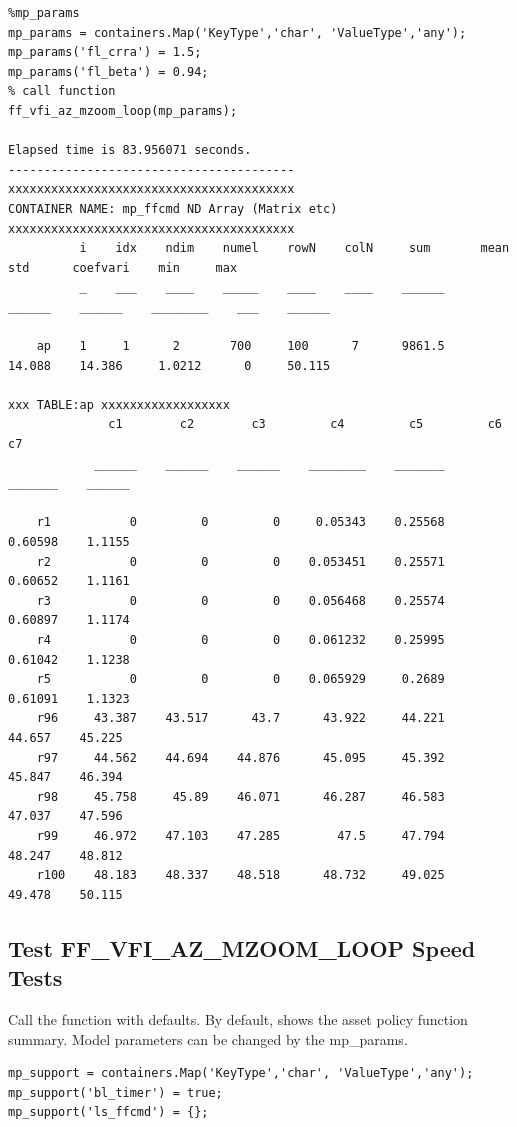 \documentclass[
]{book}
\begin{document}
\begin{verbatim}
%mp_params
mp_params = containers.Map('KeyType','char', 'ValueType','any');
mp_params('fl_crra') = 1.5;
mp_params('fl_beta') = 0.94;
% call function
ff_vfi_az_mzoom_loop(mp_params);

Elapsed time is 83.956071 seconds.
----------------------------------------
xxxxxxxxxxxxxxxxxxxxxxxxxxxxxxxxxxxxxxxx
CONTAINER NAME: mp_ffcmd ND Array (Matrix etc)
xxxxxxxxxxxxxxxxxxxxxxxxxxxxxxxxxxxxxxxx
          i    idx    ndim    numel    rowN    colN     sum       mean      std      coefvari    min     max  
          _    ___    ____    _____    ____    ____    ______    ______    ______    ________    ___    ______

    ap    1     1      2       700     100      7      9861.5    14.088    14.386     1.0212      0     50.115

xxx TABLE:ap xxxxxxxxxxxxxxxxxx
              c1        c2        c3         c4         c5         c6         c7  
            ______    ______    ______    ________    _______    _______    ______

    r1           0         0         0     0.05343    0.25568    0.60598    1.1155
    r2           0         0         0    0.053451    0.25571    0.60652    1.1161
    r3           0         0         0    0.056468    0.25574    0.60897    1.1174
    r4           0         0         0    0.061232    0.25995    0.61042    1.1238
    r5           0         0         0    0.065929     0.2689    0.61091    1.1323
    r96     43.387    43.517      43.7      43.922     44.221     44.657    45.225
    r97     44.562    44.694    44.876      45.095     45.392     45.847    46.394
    r98     45.758     45.89    46.071      46.287     46.583     47.037    47.596
    r99     46.972    47.103    47.285        47.5     47.794     48.247    48.812
    r100    48.183    48.337    48.518      48.732     49.025     49.478    50.115
\end{verbatim}

\hypertarget{test-ff_vfi_az_mzoom_loop-speed-tests}{%
\subsection{Test FF\_VFI\_AZ\_MZOOM\_LOOP Speed Tests}\label{test-ff_vfi_az_mzoom_loop-speed-tests}}

Call the function with defaults. By default, shows the asset policy
function summary. Model parameters can be changed by the mp\_params.

\begin{verbatim}
mp_support = containers.Map('KeyType','char', 'ValueType','any');
mp_support('bl_timer') = true;
mp_support('ls_ffcmd') = {};
\end{verbatim}
\end{document}

